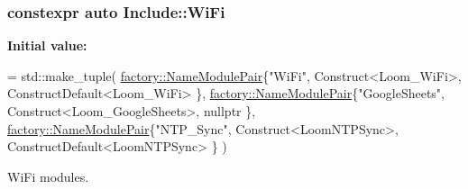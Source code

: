 \subsubsection[{\texorpdfstring{Wi\+Fi}{WiFi}}]{\setlength{\rightskip}{0pt plus 5cm}constexpr auto Include\+::\+Wi\+Fi}\hypertarget{namespace_include_a6cf33ac8efc6a5092ce9a6af9cf02d36}{}\label{namespace_include_a6cf33ac8efc6a5092ce9a6af9cf02d36}
{\bfseries Initial value\+:}
\begin{DoxyCode}
= std::make\_tuple(
                \hyperlink{structfactory_1_1_name_module_pair}{factory::NameModulePair}\{\textcolor{stringliteral}{"WiFi"},          Construct<Loom\_WiFi>,           
      ConstructDefault<Loom\_WiFi> \},
                \hyperlink{structfactory_1_1_name_module_pair}{factory::NameModulePair}\{\textcolor{stringliteral}{"GoogleSheets"},  
      Construct<Loom\_GoogleSheets>,   \textcolor{keyword}{nullptr} \},
                \hyperlink{structfactory_1_1_name_module_pair}{factory::NameModulePair}\{\textcolor{stringliteral}{"NTP\_Sync"},  Construct<LoomNTPSync>,         
      ConstructDefault<LoomNTPSync> \}
            )
\end{DoxyCode}


Wi\+Fi modules. 

